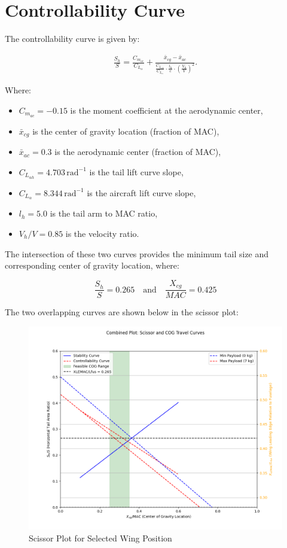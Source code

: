 \documentclass[12pt]{report}
\begin{document}
\newpage

\section{Controllability Curve}

The controllability curve is given by:

\begin{align}
	\frac{S_h}{S} = \frac{C_{m_{ac}}}{C_{L_{\alpha}}} + \frac{\bar{x}_{cg} - \bar{x}_{ac}}{\frac{C_{L_{\alpha h}}}{C_{L_{\alpha}}} \cdot \frac{l_h}{c} \cdot \left( \frac{V_h}{V} \right)^2}.
\end{align}

Where:
\begin{itemize}
	\item \( C_{m_{ac}} = -0.15 \) is the moment coefficient at the aerodynamic center,
	\item \( \bar{x}_{cg} \) is the center of gravity location (fraction of MAC),
	\item \( \bar{x}_{ac} = 0.3 \) is the aerodynamic center (fraction of MAC),
	\item \( C_{L_{\alpha h}} = 4.703 \, \text{rad}^{-1} \) is the tail lift curve slope,
	\item \( C_{L_{\alpha}} = 8.344 \, \text{rad}^{-1} \) is the aircraft lift curve slope,
	\item \( l_h = 5.0 \) is the tail arm to MAC ratio,
	\item \( V_h / V = 0.85 \) is the velocity ratio.
\end{itemize}

The intersection of these two curves provides the minimum tail size and corresponding center of gravity location, where:

\[
\frac{S_h}{S} = 0.265 \quad \text{and} \quad \frac{X_{cg}}{MAC} = 0.425
\]

The two overlapping curves are shown below in the scissor plot:

\begin{figure}[h!]
	\centering
	\includegraphics[width=6.5in]{Figures/Combined_Plot.png}
	\caption{Scissor Plot for Selected Wing Position}
	\label{fig:ScissorPlot}
\end{figure}
\end{document}
